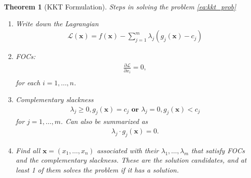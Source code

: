 \documentclass[10pt,a4paper]{book}
\newtheorem{theorem}{Theorem}[section]
\theoremstyle{definition}\newtheorem{definition}{Definition}
\theoremstyle{definition}\newtheorem{fact}{Fact}
\theoremstyle{definition}\newtheorem{ex}{Ex.}
\theoremstyle{definition}\newtheorem{project}{Project}
\theoremstyle{definition}\newtheorem{problem}{Problem}
\theoremstyle{definition}\newtheorem{example}{Example}
\numberwithin{theorem}{chapter}
\numberwithin{corollary}{chapter}
\numberwithin{assumption}{chapter}
\numberwithin{definition}{chapter}
\numberwithin{prop}{chapter}
\numberwithin{notation}{chapter}
\numberwithin{problem}{chapter}
\numberwithin{example}{chapter}
\numberwithin{fact}{chapter}
\numberwithin{ex}{chapter}
\newenvironment{ftheorem}
{\begin{mdframed}\begin{theorem}}
		{\end{theorem}\end{mdframed}}
\def\x{\mathbf x}
\begin{document}
	\begin{ftheorem}[KKT Formulation]
		Steps in solving the problem \eqref{eq:kkt_prob}
		\begin{enumerate}
			\item Write down the Lagrangian
			\begin{align*}
				\mathcal{L}(\x) = f(\x) - \sum_{j=1}^m \lambda_j (g_j(\x) - c_j) 
			\end{align*} 
			
			\item FOCs:
			\begin{align*}
				\frac{\partial \mathcal{L}}{\partial x_i} = 0, \\
			\end{align*}
			for each $i=1, \dots, n$.
			
			\item Complementary slackness
			\begin{align*}
				\lambda_j \geq 0, g_j(\x) = c_j             
				\textbf{ or } \lambda_j = 0, g_j(\x) < c_j 
			\end{align*}
			for $j=1,\dots,m$. Can also be summarized as
			\begin{align*}
				\lambda_j \cdot g_j(\x) = 0.
			\end{align*}	
			
			\item Find all $\x = (x_1,\dots, x_n)$ associated with their $\lambda_1, \dots, \lambda_m$ that satisfy FOCs and the complementary slackness. These are the solution candidates, and at least 1 of them solves the problem if it has a solution.
		\end{enumerate}
	\end{ftheorem}
	
\end{document}
